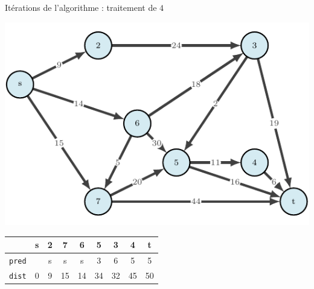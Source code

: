 \begin{frame}{Itérations de l'algorithme : traitement de $4$}
    \begin{center}
        \includegraphics[height=.6\textheight]{fig/dijkstra-0.pdf}      
    \begin{tabular}{c|cccccccc}
      
        & \textbf{s}   &\textbf{2}     &\textbf{7}     &\textbf{6}     &\textbf{5}     &\textbf{3}     &\textbf{4}     &t      \\
        \hline
        \texttt{pred} & &s      &s      &s      &3      &6      &5      &5      \\
        \texttt{dist} & 0       &9      &15     &14     &34     &32     &45     &50     \\
                \end{tabular}
\end{center}
\end{frame}

